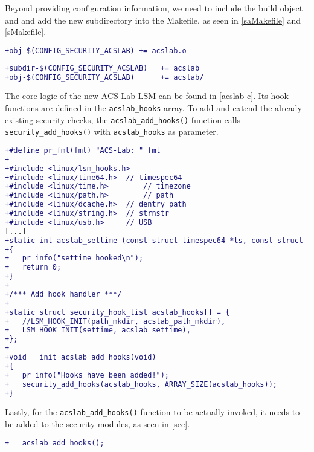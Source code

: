 \documentclass{semdoc}
\begin{document}
Beyond providing configuration information, we need to include the build object and and add the new subdirectory into the Makefile, as seen in \cref{saMakefile} and \cref{sMakefile}. 

\begin{lstlisting}[label={saMakefile}, language=diff, caption={New file \texttt{security/acslab/Makefile}}]
+obj-$(CONFIG_SECURITY_ACSLAB) += acslab.o
\end{lstlisting}

\begin{lstlisting}[label={sMakefile}, language=diff, caption={Changes in \texttt{security/Makefile}}]
+subdir-$(CONFIG_SECURITY_ACSLAB)	+= acslab
+obj-$(CONFIG_SECURITY_ACSLAB)		+= acslab/
\end{lstlisting}


The core logic of the new ACS-Lab LSM can be found in \cref{acslab-c}. 
Its hook functions are defined in the \texttt{acslab\_hooks} array.
To add and extend the already existing security checks, the \texttt{acslab\_add\_hooks()} function calls \texttt{security\_add\_hooks()} with \texttt{acslab\_hooks} as parameter.


\begin{lstlisting}[label={acslab-c},language=diff, caption={New file \texttt{security/acslab/acslab.c} (excerpt)}]
+#define pr_fmt(fmt) "ACS-Lab: " fmt
+
+#include <linux/lsm_hooks.h>
+#include <linux/time64.h>	// timespec64
+#include <linux/time.h>		// timezone
+#include <linux/path.h>		// path
+#include <linux/dcache.h>	// dentry_path
+#include <linux/string.h>	// strnstr
+#include <linux/usb.h>		// USB
[...]
+static int acslab_settime (const struct timespec64 *ts, const struct timezone *tz)
+{
+	pr_info("settime hooked\n");
+	return 0;
+}
+
+/*** Add hook handler ***/
+
+static struct security_hook_list acslab_hooks[] = {
+	//LSM_HOOK_INIT(path_mkdir, acslab_path_mkdir),
+	LSM_HOOK_INIT(settime, acslab_settime),
+};
+
+void __init acslab_add_hooks(void)
+{
+	pr_info("Hooks have been added!");
+	security_add_hooks(acslab_hooks, ARRAY_SIZE(acslab_hooks));
+}
\end{lstlisting} 

Lastly, for the \texttt{acslab\_add\_hooks()} function to be actually invoked, it needs to be added to the security modules, as seen in \cref{sec}. 

\begin{lstlisting}[label={sec}, language=diff, caption={Changes in \texttt{security/security.c}}]
+	acslab_add_hooks();
\end{lstlisting}
\end{document}
